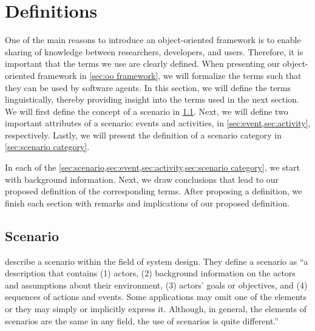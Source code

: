 \section{Definitions}
\label{sec:definitions}

One of the main reasons to introduce an \cstartb object-oriented framework \cendb is to enable sharing of knowledge between researchers, developers, and users. 
Therefore, it is important that the terms we use are clearly defined. 
When presenting our \cstartb object-oriented framework \cendb in \cref{sec:oo framework}, we will formalize the terms such that they can be used by software agents.
In this section, we will define the terms linguistically, thereby providing insight into the terms used in the next section.
We will first define the concept of a scenario in \cref{sec:scenario}. 
Next, we will define two important attributes of a scenario: events and activities, in \cref{sec:event,sec:activity}, respectively. 
Lastly, we will present the definition of a scenario category in \cref{sec:scenario category}.

In each of the \cref{sec:scenario,sec:event,sec:activity,sec:scenario category}, we start with background information. Next, we draw conclusions that lead to our proposed definition of the corresponding terms. After proposing a definition, we finish each section with remarks and implications of our proposed definition.



\subsection{Scenario}
\label{sec:scenario}

\textcite{go2004blind} describe a scenario within the field of system design. They define a scenario as ``a description that contains (1) actors, (2) background information on the actors and assumptions about their environment, (3) actors' goals or objectives, and (4) sequences of actions and events. Some applications may omit one of the elements or they may simply or implicitly express it. Although, in general, the elements of scenarios are the same in any field, the use of scenarios is quite different.'' 

